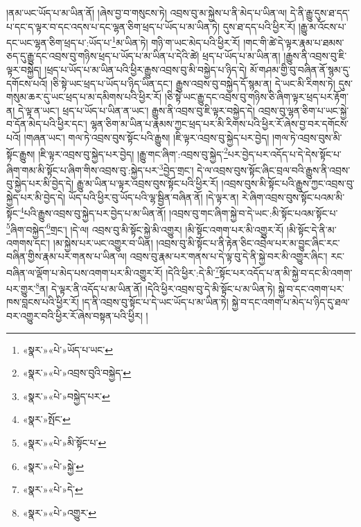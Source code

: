 །ནམ་ཡང་ཡོད་པ་མ་ཡིན་ནོ། །ཞེས་བྱ་བ་གསུངས་ཏེ། འབྲས་བུ་མ་སྐྱེས་པ་ནི་མེད་པ་ཡིན་ལ། དེ་ནི་རྒྱུ་དུས་ཐ་དད་པ་དང་ད་ལྟར་བ་དང་འདས་པ་དང་ལྷན་ཅིག་ཕྲད་པ་ཡོད་པ་མ་ཡིན་ཏེ། དུས་ཐ་དད་པའི་ཕྱིར་རོ། །རྒྱུ་མ་འོངས་པ་དང་ཡང་ལྷན་ཅིག་ཕྲད་པ་:ཡོད་པ་\footnote{«སྣར་»«པེ་»ཡོད་པ་ཡང་}མ་ཡིན་ཏེ། གཉི་ག་ཡང་མེད་པའི་ཕྱིར་རོ། །གང་གི་ཚེ་དེ་ལྟར་རྣམ་པ་ཐམས་ཅད་དུ་རྒྱུ་དང་འབྲས་བུ་གཉིས་ཕྲད་པ་ཡོད་པ་མ་ཡིན་པ་དེའི་ཚེ། ཕྲད་པ་ཡོད་པ་མ་ཡིན་ན། །རྒྱུས་ནི་འབྲས་བུ་ཇི་ལྟར་བསྐྱེད། །ཕྲད་པ་ཡོད་པ་མ་ཡིན་པའི་ཕྱིར་རྒྱུས་འབྲས་བུ་མི་བསྐྱེད་པ་ཉིད་དེ། མོ་གཤམ་གྱི་བུ་བཞིན་ནོ་སྙམ་དུ་དགོངས་པའོ། །ཅི་སྟེ་ཡང་ཕྲད་པ་ཡོད་པ་ཉིད་ཡིན་དང་། རྒྱུས་འབྲས་བུ་བསྐྱེད་དོ་སྙམ་ན། དེ་ཡང་མི་རིགས་ཏེ། དུས་གསུམ་ཆར་དུ་ཡང་ཕྲད་པ་མ་དམིགས་པའི་ཕྱིར་རོ། །ཅི་སྟེ་ཡང་རྒྱུ་དང་འབྲས་བུ་གཉིས་ཅི་ཞིག་ལྟར་ཕྲད་པར་རྟོག་ན། དེ་ལྟ་ན་ཡང་། ཕྲད་པ་ཡོད་པ་ཡིན་ན་ཡང་། རྒྱུས་ནི་འབྲས་བུ་ཇི་ལྟར་བསྐྱེད་དེ། འབྲས་བུ་ལྷན་ཅིག་པ་ཡང་སྐྱེ་བ་དོན་མེད་པའི་ཕྱིར་དང་། ལྷན་ཅིག་མ་ཡིན་པ་རྣམས་ཀྱང་ཕྲད་པར་མི་རིགས་པའི་ཕྱིར་རོ་ཞེས་བྱ་བར་དགོངས་པའོ། །གཞན་ཡང་། གལ་ཏེ་འབྲས་བུས་སྟོང་པའི་རྒྱུས། །ཇི་ལྟར་འབྲས་བུ་སྐྱེད་པར་བྱེད། །གལ་ཏེ་འབྲས་བུས་མི་སྟོང་རྒྱུས། །ཇི་ལྟར་འབྲས་བུ་སྐྱེད་པར་བྱེད། །རྒྱུ་གང་ཞིག་:འབྲས་བུ་སྐྱེད་\footnote{«སྣར་»«པེ་»འབྲས་བུའི་བསྐྱེད་}པར་བྱེད་པར་འདོད་པ་དེ་དེས་སྟོང་པ་ཞིག་གམ་མི་སྟོང་པ་ཞིག་གིས་འབྲས་བུ་:སྐྱེད་པར་\footnote{«སྣར་»«པེ་»བསྐྱེད་པར་}བྱེད་གྲང་། དེ་ལ་འབྲས་བུས་སྟོང་ཞིང་བྲལ་བའི་རྒྱུས་ནི་འབྲས་བུ་སྐྱེད་པར་མི་བྱེད་དེ། རྒྱུ་མ་ཡིན་པ་ལྟར་འབྲས་བུས་སྟོང་པའི་ཕྱིར་རོ། །འབྲས་བུས་མི་སྟོང་པའི་རྒྱུས་ཀྱང་འབྲས་བུ་སྐྱེད་པར་མི་བྱེད་དེ། ཡོད་པའི་ཕྱིར་བུ་ཡོད་པའི་ལྷ་སྦྱིན་བཞིན་ནོ། །དེ་ལྟར་ན། རེ་ཞིག་འབྲས་བུས་སྟོང་པའམ་མི་སྟོང་\footnote{«སྣར་»སྤོང་}པའི་རྒྱུས་འབྲས་བུ་སྐྱེད་པར་བྱེད་པ་མ་ཡིན་ནོ། །འབྲས་བུ་གང་ཞིག་སྐྱེ་བ་དེ་ཡང་:མི་སྟོང་པའམ་སྟོང་པ་\footnote{«སྣར་»«པེ་»མི་སྟོང་པ་}ཞིག་བསྐྱེད་\footnote{«སྣར་»«པེ་»སྐྱེ་}གྲང་། །དེ་ལ། འབྲས་བུ་མི་སྟོང་སྐྱེ་མི་འགྱུར། །མི་སྟོང་འགག་པར་མི་འགྱུར་རོ། །མི་སྟོང་དེ་ནི་མ་འགགས་དང་། །མ་སྐྱེས་པར་ཡང་འགྱུར་བ་ཡིན། །འབྲས་བུ་མི་སྟོང་པ་ནི་རྟེན་ཅིང་འབྲེལ་པར་མ་བྱུང་ཞིང་རང་བཞིན་གྱིས་རྣམ་པར་གནས་པ་ཡིན་ལ། འབྲས་བུ་རྣམ་པར་གནས་པ་དེ་ལྟ་བུ་དེ་ནི་སྐྱེ་བར་མི་འགྱུར་ཞིང་། རང་བཞིན་ལ་ལྡོག་པ་མེད་པས་འགག་པར་མི་འགྱུར་རོ། །དེའི་ཕྱིར་:དེ་མི་\footnote{«སྣར་»«པེ་»དེ་}སྟོང་པར་འདོད་པ་ན་མི་སྐྱེ་བ་དང་མི་འགག་པར་གྱུར་\footnote{«སྣར་»«པེ་»འགྱུར་}ན། དེ་ལྟར་ནི་འདོད་པ་མ་ཡིན་ནོ། །དེའི་ཕྱིར་འབྲས་བུ་དེ་མི་སྟོང་པ་མ་ཡིན་ཏེ། སྐྱེ་བ་དང་འགག་པར་ཁས་བླངས་པའི་ཕྱིར་རོ། །ད་ནི་འབྲས་བུ་སྟོང་པ་དེ་ཡང་ཡོད་པ་མ་ཡིན་ཏེ། སྐྱེ་བ་དང་འགག་པ་མེད་པ་ཉིད་དུ་ཐལ་བར་འགྱུར་བའི་ཕྱིར་རོ་ཞེས་བསྟན་པའི་ཕྱིར། །
